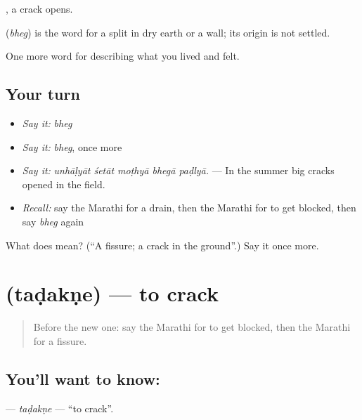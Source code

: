  , a crack opens.

\begin{cousinweb}
\textbf{} (\emph{bheg}) is the word for a split in dry earth or a wall; its origin is not settled.
\end{cousinweb}

\begin{grammarlens}[title={What you've built}]
One more word for describing what you lived and felt.
\end{grammarlens}

\subsection*{Your turn}
\begin{itemize}
\raggedright
  \item \emph{Say it:} \emph{bheg}
  \item \emph{Say it:} \emph{bheg}, once more
  \item \emph{Say it:} \emph{unhāḷyāt śetāt moṭhyā bhegā paḍlyā.} — In the summer big cracks opened in the field.
  \item \emph{Recall:} say the Marathi for a drain, then the Marathi for to get blocked, then say \emph{bheg} again
\end{itemize}

\begin{tcolorbox}[breakable,colback=teal!4,colframe=teal!35!black,title={Before you move on}]
What does  mean? (\textquotedblleft{}A fissure; a crack in the ground\textquotedblright{}.) Say it once more.
\end{tcolorbox}
\section[\texorpdfstring{\mr{तडकणे} (taḍakṇe)}{तडकणे (taḍakṇe)}]{ (taḍakṇe) — to crack}

\label{lesson:MR-C521-tadakne}



\begin{quote}
Before the new one: say the Marathi for to get blocked, then the Marathi for a fissure.
\end{quote}

\subsection*{You'll want to know: }
\textbf{} — \emph{taḍakṇe} — \textquotedblleft{}to crack\textquotedblright{}.

